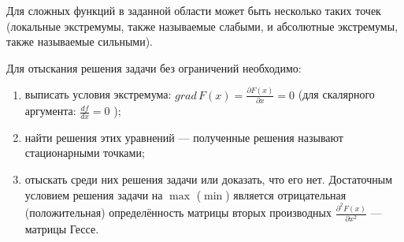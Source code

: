 \documentclass[preprint,russian,a5paper,10pt,twoside,mediummath]{ncc}
\begin{document}
Для сложных функций в заданной области может быть несколько таких точек (локальные экстремумы, также называемые слабыми, и абсолютные экстремумы, также называемые сильными).

Для отыскания решения задачи без ограничений необходимо:
\begin{enumerate}
\item выписать условия экстремума: $ grad \, F \left( x \right) = \frac{\partial F\left( x \right)}{\partial x}=0$ (для скалярного аргумента: $\frac{df}{dx}=0$ );
\item найти решения этих уравнений --- полученные решения называют стационарными точками;
\item отыскать среди них решения задачи или доказать, что его нет. Достаточным условием решения задачи на $\max$ ($\min$) является отрицательная (положительная) определённость матрицы вторых производных $ \frac{ \partial ^ 2 F \left( x \right) }{ \partial x ^ 2} $ --- матрицы Гессе.
\end{enumerate}
\end{document}
